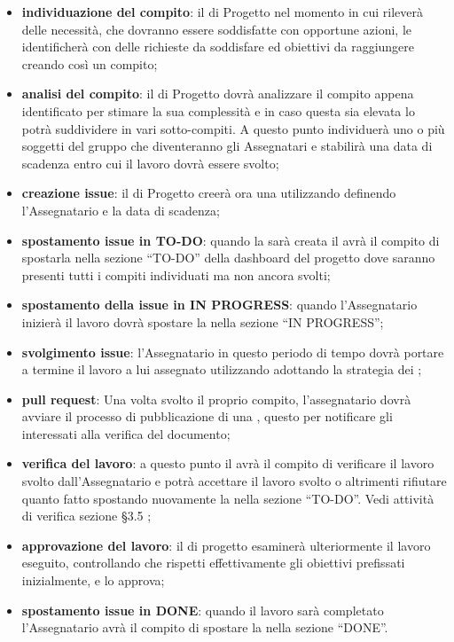             \begin{itemize}
                \item\textbf{individuazione del compito}: il  di Progetto nel momento in cui rileverà delle necessità, che dovranno essere soddisfatte con opportune azioni, le identificherà con delle richieste da soddisfare ed obiettivi da raggiungere creando così un compito;
                \item\textbf{analisi del compito}: il  di Progetto dovrà analizzare il compito appena identificato per stimare la sua complessità e in caso questa sia elevata lo potrà suddividere in vari sotto-compiti. A questo punto individuerà uno o più soggetti del gruppo che diventeranno gli Assegnatari e stabilirà una data di scadenza entro cui il lavoro dovrà essere svolto;
                \item\textbf{creazione issue}: il  di Progetto creerà ora una  utilizzando  definendo l’Assegnatario e la data di scadenza;
                \item\textbf{spostamento issue in TO-DO}: quando la  sarà creata il  avrà il compito di spostarla nella sezione “TO-DO” della dashboard del progetto dove saranno presenti tutti i compiti individuati ma non ancora svolti; 
                \item\textbf{spostamento della issue in IN PROGRESS}: quando l’Assegnatario inizierà il lavoro dovrà spostare la  nella sezione “IN PROGRESS”;
                \item\textbf{svolgimento issue}: l’Assegnatario in questo periodo di tempo dovrà portare a termine il lavoro a lui assegnato utilizzando adottando la strategia dei ;
                \item\textbf{pull request}: Una volta svolto il proprio compito, l'assegnatario dovrà avviare il processo di pubblicazione di una , questo per notificare gli interessati alla verifica del documento;
                \item\textbf{verifica del lavoro}: a questo punto il  avrà il compito di verificare il lavoro svolto dall’Assegnatario e potrà accettare il lavoro svolto o altrimenti rifiutare quanto fatto spostando nuovamente la  nella sezione “TO-DO”. Vedi attività di verifica sezione §3.5 ;
                \item\textbf{approvazione del lavoro}: il  di progetto esaminerà ulteriormente il lavoro eseguito, controllando che rispetti effettivamente gli obiettivi prefissati inizialmente, e lo approva;
                \item\textbf{spostamento issue in DONE}: quando il lavoro sarà completato l’Assegnatario avrà il compito di spostare la  nella sezione “DONE”.
            \end{itemize}
